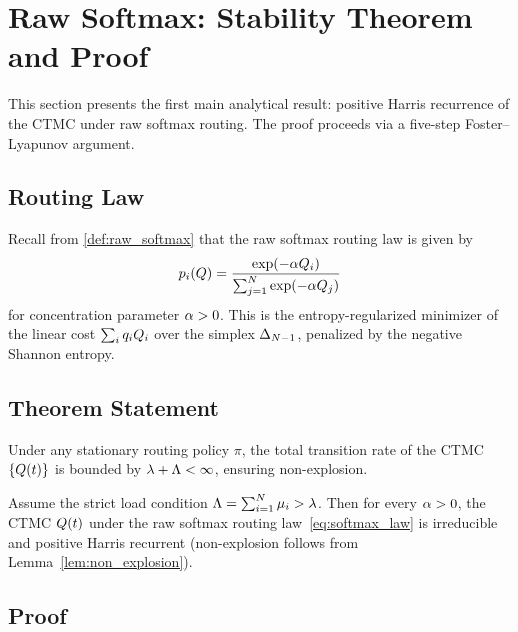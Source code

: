 
\section{Raw Softmax: Stability Theorem and Proof}
\label{sec:softmax_theorem}

This section presents the first main analytical result: positive Harris recurrence of the CTMC under raw softmax routing. The proof proceeds via a five-step Foster--Lyapunov argument.

\subsection{Routing Law}
\label{sec:softmax:routing}

Recall from \cref{def:raw_softmax} that the raw softmax routing law is given by
\begin{equation}
\label{eq:softmax_law}
p_{i}(Q) = \frac{\exp(-\alpha Q_{i})}{\sum_{j=1}^{N} \exp(-\alpha Q_{j})}
\end{equation}
for concentration parameter $\alpha > 0$. This is the entropy-regularized minimizer of the linear cost $\sum_i q_i Q_{i}$ over the simplex $\Delta_{N-1}$, penalized by the negative Shannon entropy.

\subsection{Theorem Statement}

\begin{lemma}
\label{lem:non_explosion}
Under any stationary routing policy $\pi$, the total transition rate of the CTMC $\{Q(t)\}$ is bounded by $\lambda + \Lambda < \infty$, ensuring non-explosion.
\end{lemma}

\begin{theorem}
\label{thm:softmax}
Assume the strict load condition $\Lambda = \sum_{i=1}^{N} \mu_i > \lambda$. Then for every $\alpha > 0$, the CTMC $Q(t)$ under the raw softmax routing law~\eqref{eq:softmax_law} is irreducible and positive Harris recurrent (non-explosion follows from Lemma~\ref{lem:non_explosion}).
\end{theorem}

\subsection{Proof}

